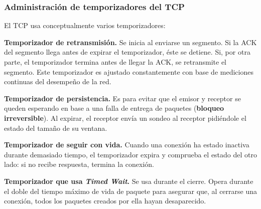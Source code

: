 \documentclass[10pt,a4paper]{article}
\begin{document}
\subsubsection{Administración de temporizadores del TCP}

El TCP usa conceptualmente varios temporizadores:
\begin{description}
\item \textbf{Temporizador de retransmisión.} Se inicia al enviarse un segmento. Si la ACK del segmento llega antes de expirar el temporizador, éste se detiene. Si, por otra parte, el temporizador termina antes de llegar la ACK, se retransmite el segmento. Este temporizador es ajustado constantemente con base de mediciones continuas del desempeño de la red.
\item \textbf{Temporizador de persistencia.} Es para evitar que el emisor y receptor se queden esperando en base a una falla de entrega de paquetes (\textbf{bloqueo irreversible}). Al expirar, el receptor envía un sondeo al receptor pidiéndole el estado del tamaño de su ventana.
\item \textbf{Temporizador de seguir con vida.} Cuando una conexión ha estado inactiva durante demasiado tiempo, el temporizador expira y comprueba el estado del otro lado: si no recibe respuesta, termina la conexión.
\item \textbf{Temporizador que usa \textit{Timed Wait}.} Se usa durante el cierre. Opera durante el doble del tiempo máximo de vida de paquete para asegurar que, al cerrarse una conexión, todos los paquetes creados por ella hayan desaparecido.
\end{description}
\end{document}
